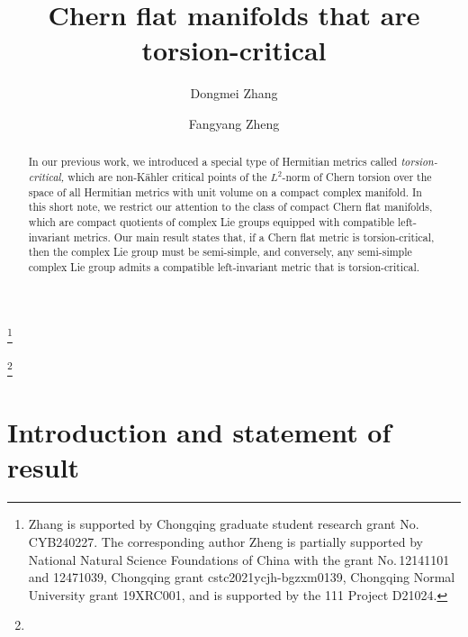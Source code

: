 \documentclass{amsart}
\begin{document}
\title[Chern flat manifolds that are torsion-critical]{Chern flat manifolds that are torsion-critical}



\author{Dongmei Zhang}
\address{Dongmei Zhang. School of Mathematical Sciences, Chongqing Normal University, Chongqing 401331, China}
\thanks{Zhang is supported by Chongqing graduate student research grant No.\,CYB240227. The corresponding author Zheng is partially supported by National Natural Science Foundations of China
with the grant No.\,12141101 and 12471039, Chongqing grant cstc2021ycjh-bgzxm0139, Chongqing Normal University grant 19XRC001, and is supported by the 111 Project D21024.}
	

\author{Fangyang Zheng}
\address{Fangyang Zheng. School of Mathematical Sciences, Chongqing Normal University, Chongqing 401331, China}
 \thanks{}


\begin{abstract}
In our previous work, we introduced a special type of Hermitian metrics called {\em torsion-critical,} which are non-K\"ahler critical points of the $L^2$-norm of Chern torsion over the space of all Hermitian metrics with unit volume on a compact complex manifold.  In this short note, we restrict our attention to the class of compact Chern flat manifolds, which are compact quotients of complex Lie groups equipped with compatible left-invariant metrics. Our main result states that, if a Chern flat metric is torsion-critical, then the complex Lie group must be semi-simple, and conversely, any semi-simple complex Lie group admits a compatible left-invariant  metric that is torsion-critical.  


\end{abstract}


\maketitle


\tableofcontents





\section{Introduction and statement of result}\label{intro}
\end{document}
